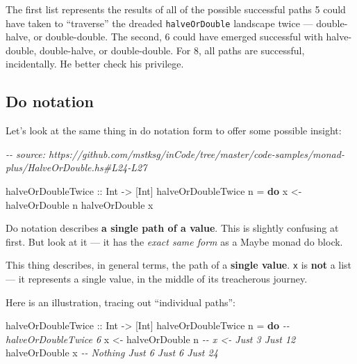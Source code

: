 \documentclass[]{article}
\newenvironment{Shaded}{}{}
\newcommand{\CommentTok}[1]{\textcolor[rgb]{0.38,0.63,0.69}{\textit{#1}}}
\newcommand{\DataTypeTok}[1]{\textcolor[rgb]{0.56,0.13,0.00}{#1}}
\newcommand{\KeywordTok}[1]{\textcolor[rgb]{0.00,0.44,0.13}{\textbf{#1}}}
\newcommand{\NormalTok}[1]{#1}
\newcommand{\OtherTok}[1]{\textcolor[rgb]{0.00,0.44,0.13}{#1}}
\begin{document}
The first list represents the results of all of the possible successful paths 5
could have taken to ``traverse'' the dreaded \texttt{halveOrDouble} landscape
twice --- double-halve, or double-double. The second, 6 could have emerged
successful with halve-double, double-halve, or double-double. For 8, all paths
are successful, incidentally. He better check his privilege.

\hypertarget{do-notation}{%
\subsection{Do notation}\label{do-notation}}

Let's look at the same thing in do notation form to offer some possible insight:

\begin{Shaded}
\begin{Highlighting}[]
\CommentTok{{-}{-} source: https://github.com/mstksg/inCode/tree/master/code{-}samples/monad{-}plus/HalveOrDouble.hs\#L24{-}L27}

\OtherTok{halveOrDoubleTwice ::} \DataTypeTok{Int} \OtherTok{{-}>}\NormalTok{ [}\DataTypeTok{Int}\NormalTok{]}
\NormalTok{halveOrDoubleTwice n }\OtherTok{=} \KeywordTok{do}
\NormalTok{    x }\OtherTok{<{-}}\NormalTok{ halveOrDouble n}
\NormalTok{    halveOrDouble x}
\end{Highlighting}
\end{Shaded}

Do notation describes \textbf{a single path of a value}. This is slightly
confusing at first. But look at it --- it has the \emph{exact same form} as a
Maybe monad do block.

This thing describes, in general terms, the path of a \textbf{single value}.
\texttt{x} is \textbf{not} a list --- it represents a single value, in the
middle of its treacherous journey.

Here is an illustration, tracing out ``individual paths'':

\begin{Shaded}
\begin{Highlighting}[]
\OtherTok{halveOrDoubleTwice ::} \DataTypeTok{Int} \OtherTok{{-}>}\NormalTok{ [}\DataTypeTok{Int}\NormalTok{]}
\NormalTok{halveOrDoubleTwice n }\OtherTok{=} \KeywordTok{do}       \CommentTok{{-}{-} halveOrDoubleTwice 6}
\NormalTok{    x }\OtherTok{<{-}}\NormalTok{ halveOrDouble n        }\CommentTok{{-}{-} x <{-}     Just 3          Just 12}
\NormalTok{    halveOrDouble x             }\CommentTok{{-}{-}      Nothing  Just 6  Just 6  Just 24}
\end{Highlighting}
\end{Shaded}
\end{document}
